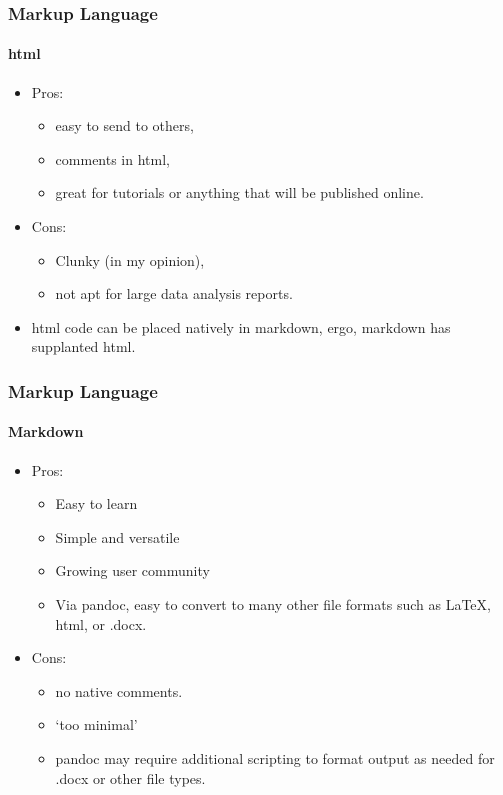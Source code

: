 \documentclass[t]{beamer}\usepackage[]{graphicx}\usepackage[]{color}
\begin{document}
\begin{frame}
  \frametitle{Markup Language}
  \framesubtitle{html}
  \begin{itemize}
    \item Pros: 
      \begin{itemize}
        \item easy to send to others, 
        \item comments in html, 
        \item great for tutorials or anything that will be published online.
      \end{itemize}
    \item Cons: 
      \begin{itemize}
        \item Clunky (in my opinion), 
        \item not apt for large data analysis reports.
      \end{itemize}

    \item html code can be placed natively in markdown, ergo, markdown has
      supplanted html.
  \end{itemize}
\end{frame}

\begin{frame}
  \frametitle{Markup Language}
  \framesubtitle{Markdown}
  \begin{itemize}
    \item Pros: 
      \begin{itemize}
        \item Easy to learn 
        \item Simple and versatile
        \item Growing user community  
        \item Via pandoc, easy to convert to many other file formats such as
          \LaTeX, html, or .docx.
      \end{itemize}
    \item Cons: 
      \begin{itemize}
        \item no native comments.  
        \item `too minimal'
        \item pandoc may require additional scripting to format output as needed
          for .docx or other file types.
      \end{itemize}
  \end{itemize}
\end{frame}
\end{document}
